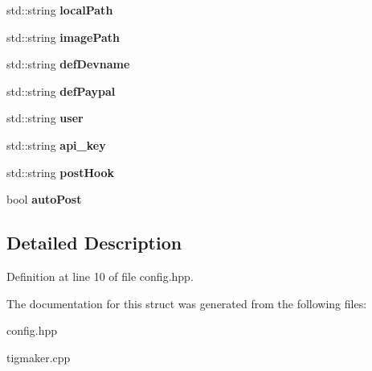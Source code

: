 \begin{DoxyCompactItemize}
\item 
\hypertarget{struct_config_a4f4448448427dc5a8b346a4a66e30b92}{std\-::string {\bfseries local\-Path}}\label{struct_config_a4f4448448427dc5a8b346a4a66e30b92}

\item 
\hypertarget{struct_config_a0b584e690f6a34b8462c85c3e11aa859}{std\-::string {\bfseries image\-Path}}\label{struct_config_a0b584e690f6a34b8462c85c3e11aa859}

\item 
\hypertarget{struct_config_ac14e6be5374dfb749dc441d6ea0f27bf}{std\-::string {\bfseries def\-Devname}}\label{struct_config_ac14e6be5374dfb749dc441d6ea0f27bf}

\item 
\hypertarget{struct_config_a15077f4171fb0f43a14d9fec23318744}{std\-::string {\bfseries def\-Paypal}}\label{struct_config_a15077f4171fb0f43a14d9fec23318744}

\item 
\hypertarget{struct_config_a63486aa0f6e97789ad5bed516ab789c8}{std\-::string {\bfseries user}}\label{struct_config_a63486aa0f6e97789ad5bed516ab789c8}

\item 
\hypertarget{struct_config_aaa8708013e3abf31b037ef34269c569b}{std\-::string {\bfseries api\-\_\-key}}\label{struct_config_aaa8708013e3abf31b037ef34269c569b}

\item 
\hypertarget{struct_config_a095ae9408d00154699d933256790ebd2}{std\-::string {\bfseries post\-Hook}}\label{struct_config_a095ae9408d00154699d933256790ebd2}

\item 
\hypertarget{struct_config_aa602ce908249dc593bab0b633d246f84}{bool {\bfseries auto\-Post}}\label{struct_config_aa602ce908249dc593bab0b633d246f84}

\end{DoxyCompactItemize}


\subsection{Detailed Description}


Definition at line 10 of file config.\-hpp.



The documentation for this struct was generated from the following files\-:\begin{DoxyCompactItemize}
\item 
config.\-hpp\item 
tigmaker.\-cpp\end{DoxyCompactItemize}
